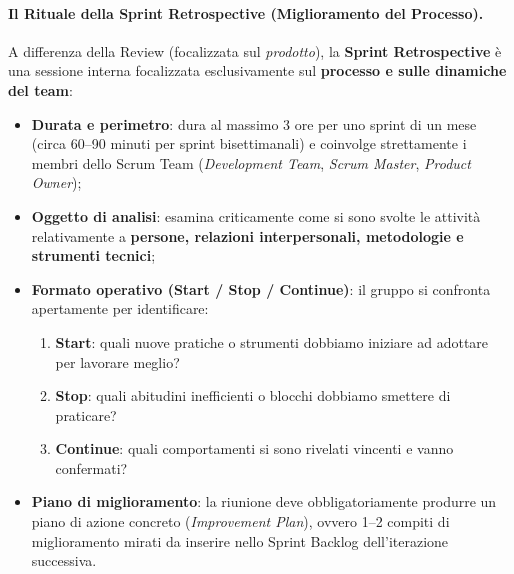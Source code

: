 \documentclass[12pt]{extarticle}
\begin{document}
\paragraph{Il Rituale della Sprint Retrospective (Miglioramento del Processo).}
A differenza della Review (focalizzata sul \textit{prodotto}), la \textbf{Sprint Retrospective} è una sessione interna focalizzata esclusivamente sul \textbf{processo e sulle dinamiche del team}:
\begin{itemize}
    \item \textbf{Durata e perimetro}: dura al massimo 3 ore per uno sprint di un mese (circa 60--90 minuti per sprint bisettimanali) e coinvolge strettamente i membri dello Scrum Team (\textit{Development Team}, \textit{Scrum Master}, \textit{Product Owner});
    \item \textbf{Oggetto di analisi}: esamina criticamente come si sono svolte le attività relativamente a \textbf{persone, relazioni interpersonali, metodologie e strumenti tecnici};
    \item \textbf{Formato operativo (Start / Stop / Continue)}: il gruppo si confronta apertamente per identificare:
    \begin{enumerate}
        \item \textbf{Start}: quali nuove pratiche o strumenti dobbiamo iniziare ad adottare per lavorare meglio?
        \item \textbf{Stop}: quali abitudini inefficienti o blocchi dobbiamo smettere di praticare?
        \item \textbf{Continue}: quali comportamenti si sono rivelati vincenti e vanno confermati?
    \end{enumerate}
    \item \textbf{Piano di miglioramento}: la riunione deve obbligatoriamente produrre un piano di azione concreto (\textit{Improvement Plan}), ovvero 1--2 compiti di miglioramento mirati da inserire nello Sprint Backlog dell'iterazione successiva.
\end{itemize}
\end{document}
